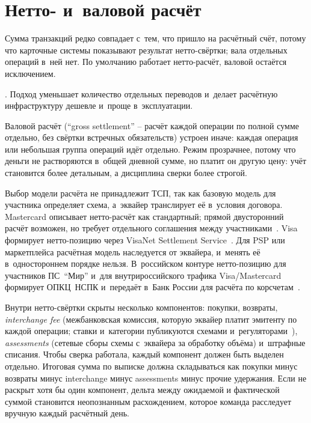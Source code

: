 \section{Нетто- и~валовой расчёт}\label{sec:recon-net-vs-gross}

Сумма транзакций редко совпадает с~тем, что пришло на
расчётный счёт, потому что карточные системы показывают результат
нетто-свёртки; вала отдельных операций в~ней нет. По умолчанию работает
нетто-расчёт, валовой остаётся исключением.

. Подход
уменьшает количество отдельных переводов и~делает расчётную
инфраструктуру дешевле и~проще в~эксплуатации.

Валовой расчёт (\enquote{gross settlement} -- расчёт каждой операции
по полной сумме отдельно, без свёртки встречных обязательств) устроен
иначе: каждая операция или небольшая группа операций идёт отдельно. Режим прозрачнее, потому что деньги не
растворяются в~общей дневной сумме, но платит он другую цену:
учёт становится более детальным, а дисциплина сверки более строгой.

Выбор модели расчёта не принадлежит ТСП, так как базовую
модель для участника определяет схема, а~эквайер транслирует её
в~условия договора. Mastercard описывает нетто-расчёт как стандартный; прямой
двусторонний расчёт возможен, но требует отдельного соглашения между
участниками~\cite{mc-rules}. Visa формирует нетто-позицию через
VisaNet Settlement Service~\cite{visa-core-rules}. Для PSP или
маркетплейса расчётная модель наследуется от
эквайера, и~менять её в~одностороннем порядке нельзя.
В~российском контуре нетто-позицию для участников ПС~\enquote{Мир} и~для внутрироссийского трафика Visa/Mastercard формирует ОПКЦ~НСПК и~передаёт в~Банк России для расчёта по корсчетам~\cite{nspk-mir-rules,cbr-ps}.

Внутри нетто-свёртки скрыты несколько компонентов: покупки, возвраты,
\textit{interchange fee} (межбанковская комиссия, которую эквайер
платит эмитенту по каждой операции; ставки и~категории
публикуются схемами и~регуляторами~\cite{visa-interchange,eu-ifr}),
\textit{assessments} (сетевые сборы схемы с~эквайера за обработку
объёма) и~штрафные списания. Чтобы сверка работала, каждый компонент
должен быть выделен отдельно. Итоговая сумма по выписке должна
складываться как покупки минус возвраты минус interchange минус
assessments минус прочие удержания. Если не раскрыт хотя бы один компонент,
дельта между ожидаемой и фактической суммой становится
неопознанным расхождением, которое команда расследует вручную каждый
расчётный день.


